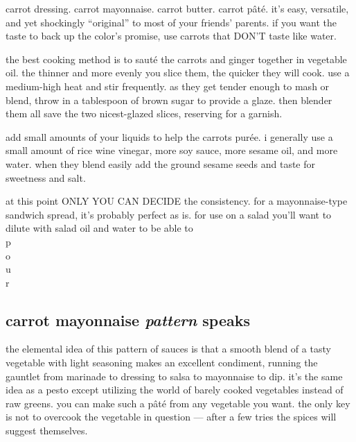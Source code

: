 carrot dressing. carrot mayonnaise. carrot butter. carrot p\^{a}t\'{e}. it's 
easy, versatile, and yet shockingly ``original'' to most of your friends' 
parents. if you want the taste to back up the color's promise, use carrots 
that DON'T taste like water.

the best cooking method is to saut\'{e} the carrots and ginger together in 
vegetable oil. the thinner and more evenly you slice them, the quicker they 
will cook. use a medium-high heat and stir frequently. as they get tender 
enough to mash or blend, throw in a tablespoon of brown sugar to provide a 
glaze. then blender them all save the two nicest-glazed slices, reserving for 
a garnish. 

add small amounts of your liquids to help the carrots pur\'{e}e. i generally 
use a small amount of rice wine vinegar, more soy sauce, more sesame oil, and 
more water. when they blend easily add the ground sesame seeds and taste for 
sweetness and salt.

\begin{minipage}{\textwidth}
at this point ONLY YOU CAN DECIDE the consistency. for a mayonnaise-type 
sandwich spread, it's probably perfect as is. for use on a salad you'll want 
to dilute with salad oil and water to be able to\\
p\\
\makebox[1ex]{}o\\
\makebox[1.5ex]{}u\\
\makebox[1.8ex]{}r
\end{minipage}

\subsection{carrot mayonnaise \textit{pattern} speaks}

the elemental idea of this pattern of sauces is that a smooth blend of a tasty 
vegetable with light seasoning makes an excellent condiment, running the 
gauntlet from marinade to dressing to salsa to mayonnaise to dip. it's the 
same idea as a pesto except utilizing the world of barely cooked vegetables 
instead of raw greens. you can make such a p\^{a}t\'{e} from any vegetable you 
want. the only key is not to overcook the vegetable in question --- after a 
few tries the spices will suggest themselves.

